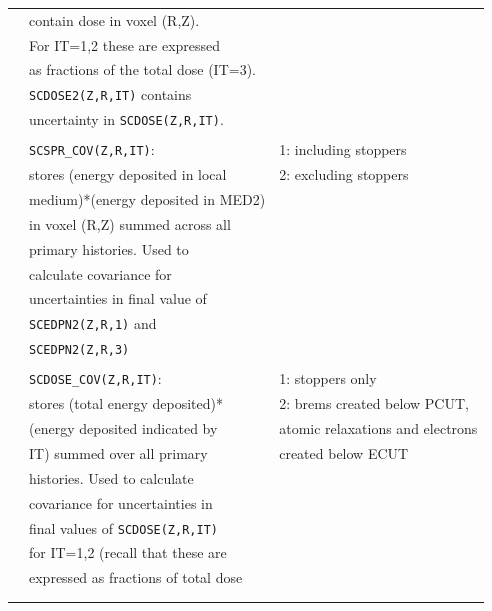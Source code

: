 \documentclass[12pt,twoside]{article}  %
\begin{document}
\begin{longtable}{lll}
         & contain dose in voxel (R,Z). &\\
         & For IT=1,2 these are expressed&\\
         & as fractions of the total dose (IT=3).&\\
         & {\tt SCDOSE2(Z,R,IT)} contains &\\
         & uncertainty in {\tt SCDOSE(Z,R,IT)}.&\\
         &&\\
         & {\tt SCSPR\_COV(Z,R,IT)}: & 1: including stoppers\\
         & stores (energy deposited in local & 2: excluding stoppers\\
         & medium)*(energy deposited in MED2) &\\
         & in voxel (R,Z) summed across all &\\
         & primary histories.  Used to &\\
         & calculate covariance for &\\
         & uncertainties in final value of &\\
         & {\tt SCEDPN2(Z,R,1)} and &\\
         & {\tt SCEDPN2(Z,R,3)} &\\
         &&\\
         & {\tt SCDOSE\_COV(Z,R,IT)}: & 1: stoppers only\\
         & stores (total energy deposited)* & 2: brems created below PCUT,\\
         & (energy deposited indicated by & atomic relaxations and electrons\\
         & IT) summed over all primary & created below ECUT\\
         & histories.  Used to calculate &\\
         & covariance for uncertainties in &\\
         & final values of {\tt SCDOSE(Z,R,IT)}&\\
         & for IT=1,2 (recall that these are&\\
         & expressed as fractions of total dose&\\
         &&\\
\label{tab:pirs702_scoring_variables}
\end{longtable}
  
   
  
\end{document}
